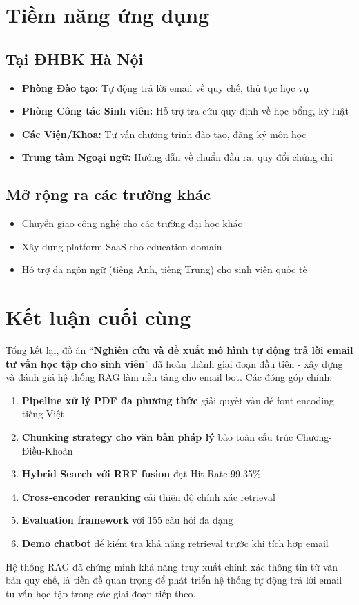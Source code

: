 \documentclass[../DoAn.tex]{subfiles}
\begin{document}
\section{Tiềm năng ứng dụng}

\subsection{Tại ĐHBK Hà Nội}
\begin{itemize}
    \item \textbf{Phòng Đào tạo:} Tự động trả lời email về quy chế, thủ tục học vụ
    \item \textbf{Phòng Công tác Sinh viên:} Hỗ trợ tra cứu quy định về học bổng, kỷ luật
    \item \textbf{Các Viện/Khoa:} Tư vấn chương trình đào tạo, đăng ký môn học
    \item \textbf{Trung tâm Ngoại ngữ:} Hướng dẫn về chuẩn đầu ra, quy đổi chứng chỉ
\end{itemize}

\subsection{Mở rộng ra các trường khác}
\begin{itemize}
    \item Chuyển giao công nghệ cho các trường đại học khác
    \item Xây dựng platform SaaS cho education domain
    \item Hỗ trợ đa ngôn ngữ (tiếng Anh, tiếng Trung) cho sinh viên quốc tế
\end{itemize}

\section{Kết luận cuối cùng}

Tổng kết lại, đồ án ``\textbf{Nghiên cứu và đề xuất mô hình tự động trả lời email tư vấn học tập cho sinh viên}'' đã hoàn thành giai đoạn đầu tiên - xây dựng và đánh giá hệ thống RAG làm nền tảng cho email bot. Các đóng góp chính:

\begin{enumerate}
    \item \textbf{Pipeline xử lý PDF đa phương thức} giải quyết vấn đề font encoding tiếng Việt
    \item \textbf{Chunking strategy cho văn bản pháp lý} bảo toàn cấu trúc Chương-Điều-Khoản
    \item \textbf{Hybrid Search với RRF fusion} đạt Hit Rate 99.35\%
    \item \textbf{Cross-encoder reranking} cải thiện độ chính xác retrieval
    \item \textbf{Evaluation framework} với 155 câu hỏi đa dạng
    \item \textbf{Demo chatbot} để kiểm tra khả năng retrieval trước khi tích hợp email
\end{enumerate}

Hệ thống RAG đã chứng minh khả năng truy xuất chính xác thông tin từ văn bản quy chế, là tiền đề quan trọng để phát triển hệ thống tự động trả lời email tư vấn học tập trong các giai đoạn tiếp theo.
\end{document}
